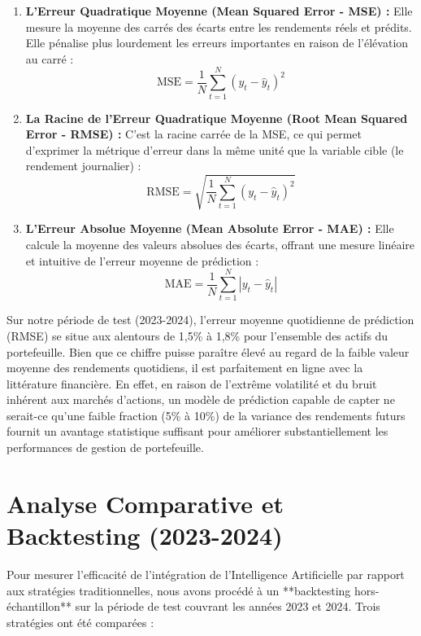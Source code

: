 \begin{enumerate}
    \item \textbf{L'Erreur Quadratique Moyenne (Mean Squared Error - MSE) :} Elle mesure la moyenne des carrés des écarts entre les rendements réels et prédits. Elle pénalise plus lourdement les erreurs importantes en raison de l'élévation au carré :
    \begin{equation}
        \text{MSE} = \frac{1}{N} \sum_{t=1}^{N} (y_t - \hat{y}_t)^2
    \end{equation}
    \item \textbf{La Racine de l'Erreur Quadratique Moyenne (Root Mean Squared Error - RMSE) :} C'est la racine carrée de la MSE, ce qui permet d'exprimer la métrique d'erreur dans la même unité que la variable cible (le rendement journalier) :
    \begin{equation}
        \text{RMSE} = \sqrt{\frac{1}{N} \sum_{t=1}^{N} (y_t - \hat{y}_t)^2}
    \end{equation}
    \item \textbf{L'Erreur Absolue Moyenne (Mean Absolute Error - MAE) :} Elle calcule la moyenne des valeurs absolues des écarts, offrant une mesure linéaire et intuitive de l'erreur moyenne de prédiction :
    \begin{equation}
        \text{MAE} = \frac{1}{N} \sum_{t=1}^{N} |y_t - \hat{y}_t|
    \end{equation}
\end{enumerate}

Sur notre période de test (2023-2024), l'erreur moyenne quotidienne de prédiction (RMSE) se situe aux alentours de 1,5\% à 1,8\% pour l'ensemble des actifs du portefeuille. Bien que ce chiffre puisse paraître élevé au regard de la faible valeur moyenne des rendements quotidiens, il est parfaitement en ligne avec la littérature financière. En effet, en raison de l'extrême volatilité et du bruit inhérent aux marchés d'actions, un modèle de prédiction capable de capter ne serait-ce qu'une faible fraction (5\% à 10\%) de la variance des rendements futurs fournit un avantage statistique suffisant pour améliorer substantiellement les performances de gestion de portefeuille.

\section{Analyse Comparative et Backtesting (2023-2024)}
Pour mesurer l'efficacité de l'intégration de l'Intelligence Artificielle par rapport aux stratégies traditionnelles, nous avons procédé à un **backtesting hors-échantillon** sur la période de test couvrant les années 2023 et 2024. Trois stratégies ont été comparées :

